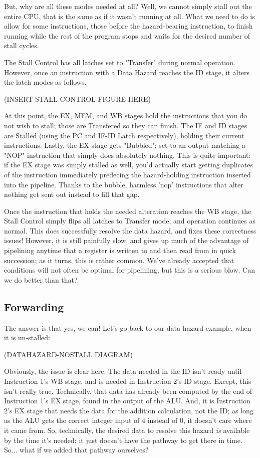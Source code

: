 \documentclass[12pt,twoside]{reedthesis}
\begin{document}
But, why are all these modes needed at all? Well, we cannot simply stall out the entire CPU, that is the same as if it wasn't running at all. What we need to do is allow for some instructions, those before the hazard-bearing instruction, to finish running while the rest of the program stops and waits for the desired number of stall cycles.

The Stall Control has all latches set to "Transfer" during normal operation. However, once an instruction with a Data Hazard reaches the ID stage, it alters the latch modes as follows.

(INSERT STALL CONTROL FIGURE HERE)

At this point, the EX, MEM, and WB stages hold the instructions that you do not wish to stall; those are Transfered so they can finish. The IF and ID stages are Stalled (using the PC and IF-ID Latch respectively), holding their current instructions. Lastly, the EX stage gets "Bubbled"; set to an output matching a "NOP" instruction that simply does absolutely nothing. This is quite important: if the EX stage was simply stalled as well, you'd actually start getting duplicates of the instruction immediately predecing the hazard-holding instruction inserted into the pipeline. Thanks to the bubble, harmless 'nop' instructions that alter nothing get sent out instead to fill that gap.

Once the instruction that holds the needed alteration reaches the WB stage, the Stall Control simply flips all latches to Transfer mode, and operation continues as normal. This does successfully resolve the data hazard, and fixes these correctness issues! However, it is still painfully slow, and gives up much of the advantage of pipelining anytime that a register is written to and then read from in quick succession; as it turns, this is rather common. We've already accepted that conditions will not often be optimal for pipelining, but this is a serious blow. Can we do better than that?

\subsection{Forwarding}

The answer is that yes, we can! Let's go back to our data hazard example, when it is un-stalled:

(DATAHAZARD-NOSTALL DIAGRAM)

Obviously, the issue is clear here: The data needed in the ID isn't ready until Instruction 1's WB stage, and is needed in Instruction 2's ID stage. Except, this isn't really true. Technically, that data has already been computed by the end of Instruction 1's EX stage, found in the output of the ALU. And, it is Instruction 2's EX stage that needs the data for the addition calculation, not the ID; as long as the ALU gets the correct integer input of $4$ instead of $0$, it doesn't care where it came from. So, technically, the desired data to resolve this hazard \textit{is} available by the time it's needed; it just doesn't have the pathway to get there in time. So... what if we added that pathway ourselves?
\end{document}
